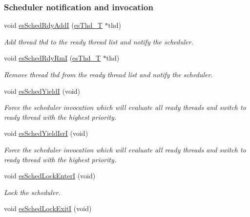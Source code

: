 \subsubsection*{Scheduler notification and invocation}
\begin{DoxyCompactItemize}
\item 
void \hyperlink{group__kern__intf_ga73e14b1860ce824c822adc407aee0977}{es\-Sched\-Rdy\-Add\-I} (\hyperlink{group__kern__intf_ga62e3a3ca0a4597a19c43cb8868810d82}{es\-Thd\-\_\-\-T} $\ast$thd)
\begin{DoxyCompactList}\small\item\em Add thread {\ttfamily thd} to the ready thread list and notify the scheduler. \end{DoxyCompactList}\item 
void \hyperlink{group__kern__intf_ga0b8263c5024ebb59cd9b95cc9253b44d}{es\-Sched\-Rdy\-Rm\-I} (\hyperlink{group__kern__intf_ga62e3a3ca0a4597a19c43cb8868810d82}{es\-Thd\-\_\-\-T} $\ast$thd)
\begin{DoxyCompactList}\small\item\em Remove thread {\ttfamily thd} from the ready thread list and notify the scheduler. \end{DoxyCompactList}\item 
void \hyperlink{group__kern__intf_gaf90e487bfce974dafaeed5009e189810}{es\-Sched\-Yield\-I} (void)
\begin{DoxyCompactList}\small\item\em Force the scheduler invocation which will evaluate all ready threads and switch to ready thread with the highest priority. \end{DoxyCompactList}\item 
void \hyperlink{group__kern__intf_gafbea29b376b29f11bbfc48a0f5144e9a}{es\-Sched\-Yield\-Isr\-I} (void)
\begin{DoxyCompactList}\small\item\em Force the scheduler invocation which will evaluate all ready threads and switch to ready thread with the highest priority. \end{DoxyCompactList}\item 
void \hyperlink{group__kern__intf_ga1e60d9df6ad1712ed57cd4ca038fcad2}{es\-Sched\-Lock\-Enter\-I} (void)
\begin{DoxyCompactList}\small\item\em Lock the scheduler. \end{DoxyCompactList}\item 
void \hyperlink{group__kern__intf_gaddd9b2fcbc03765f63f81b64e6663934}{es\-Sched\-Lock\-Exit\-I} (void)

\end{DoxyCompactItemize}
